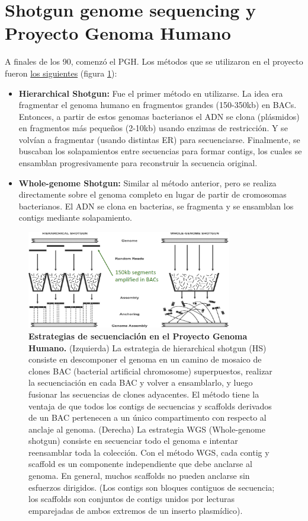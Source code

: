 \section{Shotgun genome sequencing y Proyecto Genoma Humano}
A finales de los 90, comenzó el PGH. Los métodos que se utilizaron en el proyecto fueron \href{https://www.youtube.com/watch?v=aShY577MoM0}{los siguientes} (figura \ref{fig:PGH}):
\begin{itemize}
\item \textbf{Hierarchical Shotgun:} Fue el primer método en utilizarse. La idea era fragmentar el genoma humano en fragmentos grandes (150-350kb) en BACs. Entonces, a partir de estos genomas bacterianos el ADN se clona (plásmidos) en fragmentos más pequeños (2-10kb) usando enzimas de restricción. Y se volvían a fragmentar (usando distintas ER) para secuenciarse. Finalmente, se buscaban los solapamientos entre secuencias para formar contigs, los cuales se ensamblan progresivamente para reconstruir la secuencia original. 
\item \textbf{Whole-genome Shotgun:} Similar al método anterior, pero se realiza directamente sobre el genoma completo en lugar de partir de cromosomas bacterianos. El ADN se clona en bacterias, se fragmenta y se ensamblan los contigs mediante solapamiento.
\end{itemize}

\begin{figure}[htbp]
\centering
\includegraphics[width = 0.8\textwidth]{figs/HGP-sequencing.png}
\caption{\textbf{Estrategias de secuenciación en el Proyecto Genoma Humano.} (Izquierda) La estrategia de hierarchical shotgun (HS) consiste en descomponer el genoma en un camino de mosaico de clones BAC (bacterial artificial chromosome) superpuestos, realizar la secuenciación en cada BAC y volver a ensamblarlo, y luego fusionar las secuencias de clones adyacentes. El método tiene la ventaja de que todos los contigs de secuencias y scaffolds derivados de un BAC pertenecen a un único compartimento con respecto al anclaje al genoma. (Derecha) La estrategia WGS (Whole-genome shotgun) consiste en secuenciar todo el genoma e intentar reensamblar toda la colección. Con el método WGS, cada contig y scaffold es un componente independiente que debe anclarse al genoma. En general, muchos scaffolds no pueden anclarse sin esfuerzos dirigidos. (Los contigs son bloques contiguos de secuencia; los scaffolds son conjuntos de contigs unidos por lecturas emparejadas de ambos extremos de un inserto plasmídico).}
\label{fig:PGH}
\end{figure}

